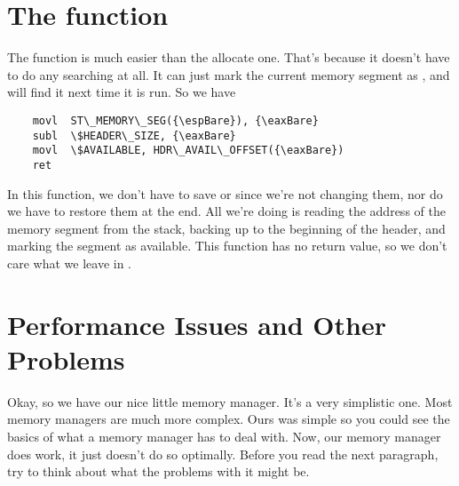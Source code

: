 \section{The  function}

The  function is much easier than the allocate one.
That's because it doesn't have to do any searching at all.  It can just mark
the current memory segment as , and 
will find it next time it is run.   So we have

\begin{simpletyping}
\begin{lstlisting}
	movl  ST\_MEMORY\_SEG({\espBare}), {\eaxBare}
	subl  \$HEADER\_SIZE, {\eaxBare}
	movl  \$AVAILABLE, HDR\_AVAIL\_OFFSET({\eaxBare})
	ret
\end{lstlisting}
\end{simpletyping}

In this function, we don't have to save \icode{{\ebpBare}} or \icode{{\espBare}}
since we're not changing them, nor do we have to restore them at the end.  All we're
doing is reading the address of the memory segment from the stack, backing up to the
beginning of the header, and marking the segment as available.  This function has no
return value, so we don't care what we leave in \icode{{\eaxBare}}.

\section{Performance Issues and Other Problems}

Okay, so we have our nice little memory manager.  It's a very simplistic one.  Most memory
managers are much more complex.  Ours was simple so you could see the basics of what
a memory manager has to deal with.  Now, our memory manager does work, it just doesn't
do so optimally.  Before you read the next paragraph, try to think about what the
problems with it might be.

